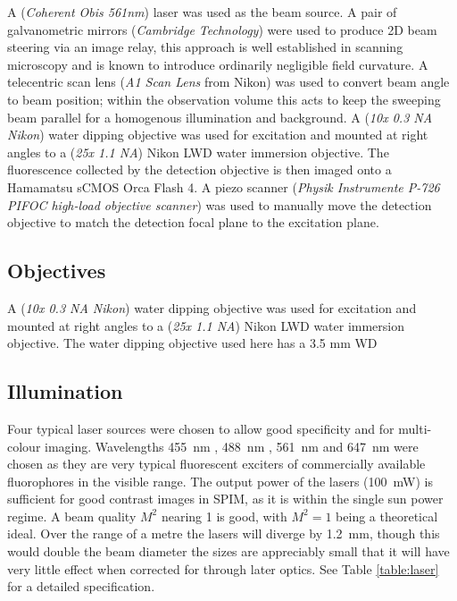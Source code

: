 A (\emph{Coherent Obis 561nm}) laser was used as the beam source.
A pair of galvanometric mirrors (\emph{Cambridge Technology}) were used to produce 2D beam steering via an image relay, this approach is well established in scanning microscopy and is known to introduce ordinarily negligible field curvature.
A telecentric scan lens (\emph{A1 Scan Lens} from Nikon) was used to convert beam angle to beam position; %
within the observation volume this acts to keep the sweeping beam parallel for a homogenous illumination and background.
A (\emph{10x 0.3 NA Nikon}) water dipping objective was used for excitation and mounted at right angles to a (\emph{25x 1.1 NA}) Nikon LWD water immersion objective.
The fluorescence collected by the detection objective is then imaged onto a Hamamatsu sCMOS Orca Flash 4.
A piezo scanner (\emph{Physik Instrumente P-726 PIFOC high-load objective scanner}) was used to manually move the detection objective to match the detection focal plane to the excitation plane.

\subsection{Objectives}

A (\emph{10x 0.3 NA Nikon}) water dipping objective was used for excitation and mounted at right angles to a (\emph{25x 1.1 NA}) Nikon LWD water immersion objective.
The water dipping objective used here has a 3.5 mm WD




\subsection{Illumination}

Four typical laser sources were chosen to allow good specificity and for multi-colour imaging.
Wavelengths \textcolor{455nm}{\SI{455}{\nano\meter}} , \textcolor{488nm}{\SI{488}{\nano\meter}} , \textcolor{561nm}{\SI{561}{\nano\meter}} and \textcolor{647nm}{\SI{647}{\nano\meter}} were chosen as they are very typical fluorescent exciters of commercially available fluorophores in the visible range.
The output power of the lasers (\SI{100}{\milli\watt}) is sufficient for good contrast images in SPIM, as it is within the single sun power regime.
A beam quality $M^2$ nearing 1 is good, with $M^2 = 1$ being a theoretical ideal.
Over the range of a metre the lasers will diverge by \SI{1.2}{\milli\meter}, though this would double the beam diameter the sizes are appreciably small that it will have very little effect when corrected for through later optics.
See Table \ref{table:laser} for a detailed specification.

